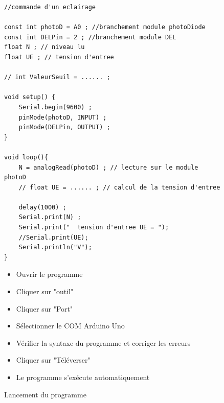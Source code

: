 \documentclass[a4paper,11pt]{article}
\begin{document}
\begin{figure}[h!]
	\caption{Lancement du programme}
	\begin{minipage}{.7\linewidth}
	\begin{lstlisting}[style=Arduino]
//commande d'un eclairage

const int photoD = A0 ; //branchement module photoDiode
const int DELPin = 2 ; //branchement module DEL
float N ; // niveau lu
float UE ; // tension d'entree

// int ValeurSeuil = ...... ;

void setup() {
    Serial.begin(9600) ;
    pinMode(photoD, INPUT) ;
    pinMode(DELPin, OUTPUT) ;
}

void loop(){
    N = analogRead(photoD) ; // lecture sur le module photoD
    // float UE = ...... ; // calcul de la tension d'entree

    delay(1000) ;
    Serial.print(N) ;
    Serial.print("  tension d'entree UE = ");
    //Serial.print(UE);
    Serial.println("V");
}
\end{lstlisting}
	\end{minipage}
	\begin{minipage}{.3\linewidth}
	\begin{itemize}
		\item Ouvrir le programme
		\item Cliquer sur "outil"
		\item Cliquer sur "Port"
		\item Sélectionner le COM Arduino Uno
		\item Vérifier la syntaxe du programme et corriger les erreurs
		\item Cliquer sur "Téléverser"
		\item Le programme s'exécute automatiquement
	\end{itemize}
	\end{minipage}
\end{figure}
\end{document}
